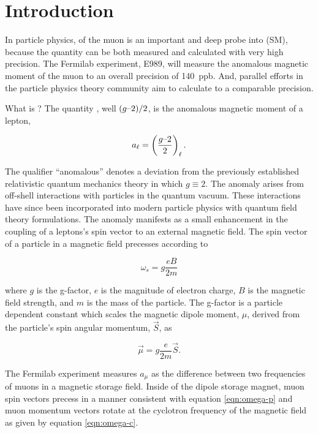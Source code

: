 \chapter {Introduction} \label{ch:intro}

In particle physics, \gmtwo of the muon is an important and deep probe into \tsm (SM), because the quantity can be both measured and calculated with very high precision.  The Fermilab \gmtwo experiment, E989, will measure the anomalous magnetic moment of the muon to an overall precision of \SI{140}{ppb}.  And, parallel efforts in the particle physics theory community aim to calculate \mugmtwo to a comparable precision.

What is \gmtwo?  The quantity \gmtwo, well $(g\hbox{--}2)/2$, is the anomalous magnetic moment of a lepton,

\begin{equation}
\label{eqn:amm-lepton}
a_\ell = \left(\frac{g\hbox{--}2}{2}\right)_\ell.
\end{equation}

\noindent
The qualifier ``anomalous'' denotes a deviation from the previously established relativistic quantum mechanics theory in which $g \equiv 2$.  The anomaly arises from off-shell interactions with particles in the quantum vacuum.  These interactions have since been incorporated into modern particle physics with quantum field theory formulations.  The anomaly manifests as a small enhancement in the coupling of a leptons's spin vector to an external magnetic field.  The spin vector of a particle in a magnetic field precesses according to 

\begin{equation}
\label{eqn:omega-p}
\omega_{s} = g \frac{e B}{2 m}
\end{equation}

\noindent
where $g$ is the g-factor, $e$ is the magnitude of electron charge, $B$ is the magnetic field strength, and $m$ is the mass of the particle.  The g-factor is a particle dependent constant which scales the magnetic dipole moment, $\mu$, derived from the particle's spin angular momentum, $\vec{S}$, as

\begin{equation}
\label{eqn:muon-mu}
\vec{\mu} = g \frac{e}{2 m} \vec{S}.
\end{equation}

The Fermilab \gmtwo experiment measures $a_\mu$ as the difference between two frequencies of muons in a magnetic storage field.  Inside of the dipole storage magnet, muon spin vectors precess in a manner consistent with equation \ref{eqn:omega-p} and muon momentum vectors rotate at the cyclotron frequency of the magnetic field as given by equation \ref{eqn:omega-c}. 

